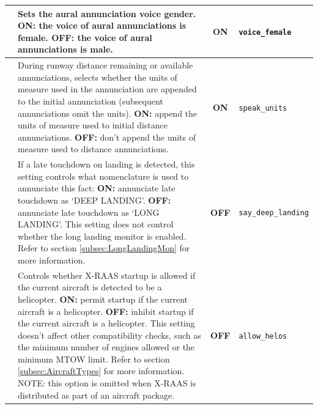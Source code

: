 \documentclass[a4paper,12pt]{article}
\newcommand{\confopt}[1]{\texttt{#1}}
\begin{document}
{\begin{center}
\begin{supertabular}{|c|p{8cm}|c|l|}
\hline

 &
Sets the aural annunciation voice gender.\newline
\textbf{ON:} the voice of aural annunciations is female.\newline
\textbf{OFF:} the voice of aural annunciations is male. &
\textbf{ON} & \confopt{voice\_female} \\

\hline

 &
During runway distance remaining or available annunciations, selects
whether the units of measure used in the annunciation are appended to the
initial annunciation (subsequent annunciations omit the units).\newline
\textbf{ON:} append the units of measure used to initial distance
annunciations.\newline
\textbf{OFF:} don't append the units of measure used to distance
annunciations. & \textbf{ON} & \confopt{speak\_units} \\

\hline

 &
If a late touchdown on landing is detected, this setting controls what
nomenclature is used to annunciate this fact:\newline
\textbf{ON:} annunciate late touchdown as `DEEP LANDING'.\newline
\textbf{OFF:} annunciate late touchdown as `LONG LANDING'.\newline
This setting does not control whether the long landing monitor is
enabled. Refer to section \ref{subsec:LongLandingMon} for more information. &
\textbf{OFF} & \confopt{say\_deep\_landing} \\

\hline

 &

Controls whether X-RAAS startup is allowed if the current aircraft is
detected to be a helicopter.\newline
\textbf{ON:} permit startup if the current aircraft is a helicopter.\newline
\textbf{OFF:} inhibit startup if the current aircraft is a helicopter.\newline
This setting doesn't affect other compatibility checks, such as the
minimum number of engines allowed or the minimum MTOW limit. Refer to
section \ref{subsec:AircraftTypes} for more information.\newline
NOTE: this option is omitted when X-RAAS is distributed as part of an
aircraft package. & \textbf{OFF} &
\confopt{allow\_helos} \\


\end{supertabular}
\end{center}}
\end{document}
